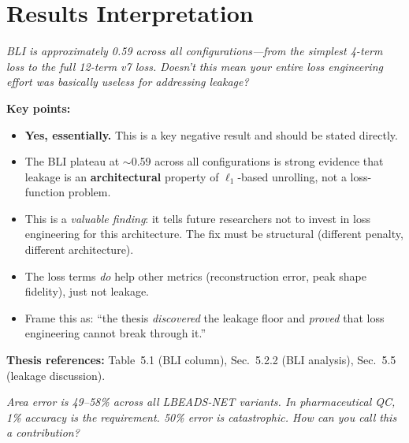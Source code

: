 \documentclass[11pt, letterpaper]{article}
\newcounter{qcounter}
\newcommand{\question}[1]{%
  \stepcounter{qcounter}%
  \begin{questionbox}[Q\theqcounter]%
    \itshape #1%
  \end{questionbox}%
}
\begin{document}
\section{Results Interpretation}

\question{BLI is approximately 0.59 across \emph{all} configurations---from
the simplest 4-term loss to the full 12-term v7 loss.  Doesn't this
mean your entire loss engineering effort was basically useless for
addressing leakage?}

\begin{answerbox}
\textbf{Key points:}
\begin{itemize}[nosep]
  \item \textbf{Yes, essentially.}  This is a key negative result
        and should be stated directly.
  \item The BLI plateau at $\sim$0.59 across all configurations is
        strong evidence that leakage is an \textbf{architectural}
        property of $\ell_1$-based unrolling, not a loss-function
        problem.
  \item This is a \emph{valuable finding}: it tells future
        researchers not to invest in loss engineering for this
        architecture.  The fix must be structural (different penalty,
        different architecture).
  \item The loss terms \emph{do} help other metrics (reconstruction
        error, peak shape fidelity), just not leakage.
  \item Frame this as: ``the thesis \emph{discovered} the leakage
        floor and \emph{proved} that loss engineering cannot break
        through it.''
\end{itemize}
\textbf{Thesis references:} Table~5.1 (BLI column), Sec.~5.2.2 (BLI analysis), Sec.~5.5 (leakage discussion).
\end{answerbox}

\question{Area error is 49--58\% across all LBEADS-NET variants.  In
pharmaceutical QC, 1\% accuracy is the requirement.  50\% error
is catastrophic.  How can you call this a contribution?}
\end{document}
